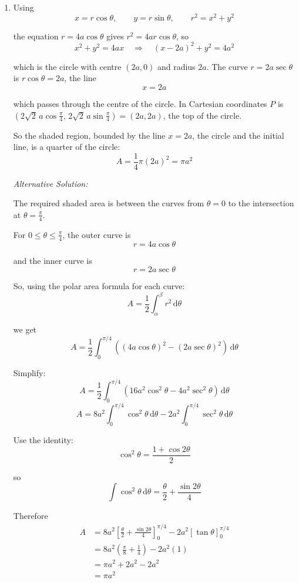 \documentclass[leqno]{article}
\begin{document}
\begin{enumerate}[
	  label=\textbf{\arabic*.},
	  leftmargin=*,
	  topsep=0pt,
	  partopsep=0pt,
	  parsep=0pt
	]
\begin{djsSolution}
\begin{enumerate}[label=\textbf{(\alph*)}]
	hence
	\[
	\theta=\frac{\pi}{4}
	\]
	
	Now find $r$:
	\[
	r=4a\cos\frac{\pi}{4}=4a\times\frac{1}{\sqrt2}=2\sqrt2\,a
	\]
	
	So the polar coordinates of $P$ are
	\[
	\left(2\sqrt2\,a,\frac{\pi}{4}\right)
	\]
	
	  \item Using
	\[
	x=r\cos\theta,\qquad y=r\sin\theta,\qquad r^2=x^2+y^2
	\]

	the equation $r=4a\cos\theta$ gives $r^2=4ar\cos\theta$, so
	\[
	x^2+y^2=4ax\quad\Longrightarrow\quad(x-2a)^2+y^2=4a^2
	\]

	which is the circle with centre $(2a,0)$ and radius $2a$. The curve $r=2a\sec\theta$ is $r\cos\theta=2a$, the line
	\[
	x=2a
	\]

	which passes through the centre of the circle. In Cartesian coordinates $P$ is $\left(2\sqrt2\,a\cos\frac{\pi}{4},\,2\sqrt2\,a\sin\frac{\pi}{4}\right)=(2a,2a)$, the top of the circle.

	So the shaded region, bounded by the line $x=2a$, the circle and the initial line, is a quarter of the circle:
	\[
	A=\frac14\pi(2a)^2=\pi a^2
	\]

	\medskip

	\textit{Alternative Solution:}

	The required shaded area is between the curves from $\theta=0$ to the intersection at $\theta=\frac{\pi}{4}$.

	For $0\le \theta \le \frac{\pi}{4}$, the outer curve is
	\[
	r=4a\cos\theta
	\]

	and the inner curve is
	\[
	r=2a\sec\theta
	\]
	
	So, using the polar area formula for each curve:
	\[
	A=\frac12\int_{\alpha}^{\beta} r^2\,\mathrm{d}\theta
	\]

	we get
	\[
	A=\frac12\int_0^{\pi/4}\left((4a\cos\theta)^2-(2a\sec\theta)^2\right)\,\mathrm{d}\theta
	\]
	
	Simplify:
	\[
	A=\frac12\int_0^{\pi/4}\left(16a^2\cos^2\theta-4a^2\sec^2\theta\right)\,\mathrm{d}\theta
	\]
	\[
	A=8a^2\int_0^{\pi/4}\cos^2\theta\,\mathrm{d}\theta-2a^2\int_0^{\pi/4}\sec^2\theta\,\mathrm{d}\theta
	\]
	
	Use the identity:
	\[
	\cos^2\theta=\frac{1+\cos 2\theta}{2}
	\]

	so
	\[
	\int \cos^2\theta\,\mathrm{d}\theta=\frac{\theta}{2}+\frac{\sin 2\theta}{4}
	\]
	
	Therefore
	\begin{align*}
	A&=8a^2\left[\frac{\theta}{2}+\frac{\sin 2\theta}{4}\right]_0^{\pi/4}
	-2a^2\left[\tan\theta\right]_0^{\pi/4} \\
	&=8a^2\left(\frac{\pi}{8}+\frac14\right)-2a^2(1) \\
	&=\pi a^2+2a^2-2a^2 \\
	&=\pi a^2
	\end{align*}
	\end{enumerate}
	\end{djsSolution}
	

\end{enumerate}
\end{document}
